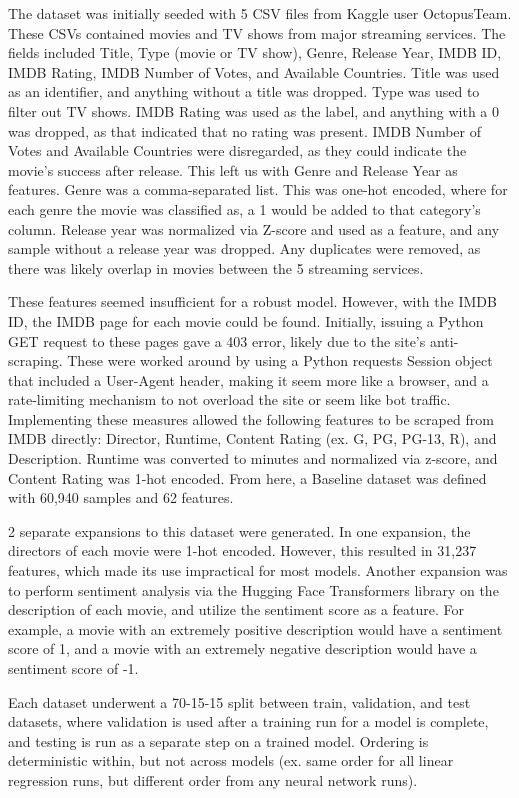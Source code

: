 \documentclass[11pt,letterpaper,oneside,titlepage]{article}
\begin{document}
The dataset was initially seeded with 5 CSV files from Kaggle user OctopusTeam\cite{OctopusTeam_2024}. These CSVs contained movies and TV shows from major streaming services. The fields included Title, Type (movie or TV show), Genre, Release Year, IMDB ID, IMDB Rating, IMDB Number of Votes, and Available Countries. Title was used as an identifier, and anything without a title was dropped. Type was used to filter out TV shows. IMDB Rating was used as the label, and anything with a 0 was dropped, as that indicated that no rating was present. IMDB Number of Votes and Available Countries were disregarded, as they could indicate the movie's success after release. This left us with Genre and Release Year as features. Genre was a comma-separated list. This was one-hot encoded, where for each genre the movie was classified as, a 1 would be added to that category's column. Release year was normalized via Z-score and used as a feature, and any sample without a release year was dropped. Any duplicates were removed, as there was likely overlap in movies between the 5 streaming services.

These features seemed insufficient for a robust model. However, with the IMDB ID, the IMDB page for each movie could be found. Initially, issuing a Python GET request to these pages gave a 403 error, likely due to the site's anti-scraping. These were worked around by using a Python requests Session object that included a User-Agent header, making it seem more like a browser, and a rate-limiting mechanism to not overload the site or seem like bot traffic. Implementing these measures allowed the following features to be scraped from IMDB directly: Director, Runtime, Content Rating (ex. G, PG, PG-13, R), and Description. Runtime was converted to minutes and normalized via z-score, and Content Rating was 1-hot encoded. From here, a Baseline dataset was defined with 60,940 samples and 62 features.

2 separate expansions to this dataset were generated. In one expansion, the directors of each movie were 1-hot encoded. However, this resulted in 31,237 features, which made its use impractical for most models. Another expansion was to perform sentiment analysis via the Hugging Face Transformers library on the description of each movie, and utilize the sentiment score as a feature. For example, a movie with an extremely positive description would have a sentiment score of 1, and a movie with an extremely negative description would have a sentiment score of -1.

Each dataset underwent a 70-15-15 split between train, validation, and test datasets, where validation is used after a training run for a model is complete, and testing is run as a separate step on a trained model. Ordering is deterministic within, but not across models (ex. same order for all linear regression runs, but different order from any neural network runs).
\end{document}
